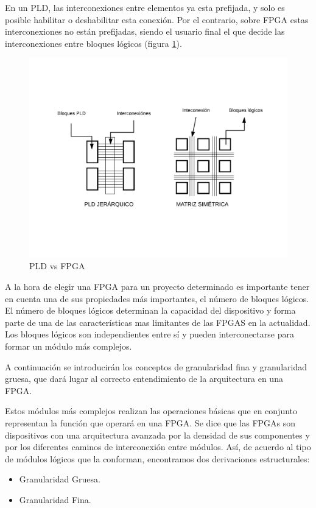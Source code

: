 En un PLD, las interconexiones entre elementos ya esta prefijada, y solo es posible habilitar o deshabilitar esta conexión. Por el contrario, sobre FPGA estas interconexiones no están prefijadas, siendo el usuario final el que decide las interconexiones entre bloques lógicos (figura \ref{fig:pld_fpga}).
\newline
\begin{center}
\begin{figure}[H]
	\center
	\includegraphics[trim = 10mm 35mm 10mm 35mm, clip,scale=0.6]{imagenes/EstadoArte/pld_fpga.pdf}
	\caption{PLD vs FPGA}
	\label{fig:pld_fpga}
\end{figure}

\end{center}

A la hora de elegir una FPGA para un proyecto determinado es importante tener en cuenta una de sus propiedades más importantes, el número de bloques lógicos. El número de bloques lógicos determinan la capacidad del dispositivo y forma parte de una de las características mas limitantes de las FPGAS en la actualidad. Los bloques lógicos son independientes entre sí y pueden interconectarse para formar un módulo más complejos. \newline

A continuación se introducirán los conceptos de granularidad fina y granularidad gruesa, que dará lugar al correcto entendimiento de la arquitectura en una FPGA. 

Estos módulos más complejos realizan las operaciones básicas que en conjunto representan la función que operará en una FPGA. Se dice que las FPGAs son dispositivos con una arquitectura avanzada por la densidad de sus componentes y por los diferentes caminos de interconexión entre módulos. Así, de acuerdo al tipo de módulos lógicos que la conforman, encontramos dos derivaciones estructurales: 
\begin{itemize}
	\item Granularidad Gruesa.
	\item Granularidad Fina.
\end{itemize}

